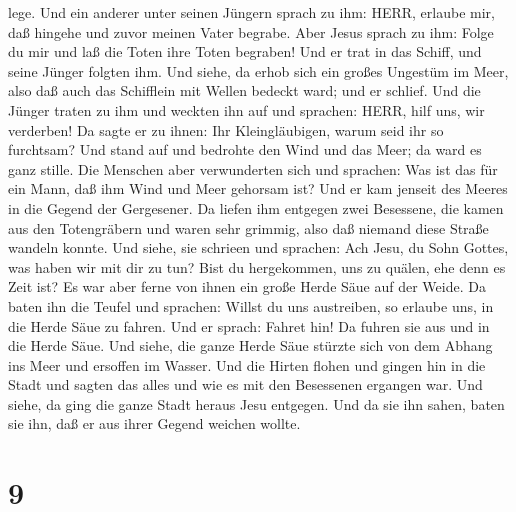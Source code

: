 lege.  Und ein anderer unter seinen Jüngern sprach zu ihm:
HERR, erlaube mir, daß hingehe und zuvor meinen Vater begrabe.
 Aber Jesus sprach zu ihm: Folge du mir und laß die Toten
ihre Toten begraben!  Und er trat in das Schiff, und seine
Jünger folgten ihm.  Und siehe, da erhob sich ein großes
Ungestüm im Meer, also daß auch das Schifflein mit Wellen bedeckt ward;
und er schlief.  Und die Jünger traten zu ihm und weckten
ihn auf und sprachen: HERR, hilf uns, wir verderben!  Da
sagte er zu ihnen: Ihr Kleingläubigen, warum seid ihr so furchtsam? Und
stand auf und bedrohte den Wind und das Meer; da ward es ganz stille.
 Die Menschen aber verwunderten sich und sprachen: Was ist
das für ein Mann, daß ihm Wind und Meer gehorsam ist?  Und
er kam jenseit des Meeres in die Gegend der Gergesener. Da liefen ihm
entgegen zwei Besessene, die kamen aus den Totengräbern und waren sehr
grimmig, also daß niemand diese Straße wandeln konnte.  Und
siehe, sie schrieen und sprachen: Ach Jesu, du Sohn Gottes, was haben
wir mit dir zu tun? Bist du hergekommen, uns zu quälen, ehe denn es Zeit
ist?  Es war aber ferne von ihnen ein große Herde Säue auf
der Weide.  Da baten ihn die Teufel und sprachen: Willst du
uns austreiben, so erlaube uns, in die Herde Säue zu fahren.
 Und er sprach: Fahret hin! Da fuhren sie aus und in die
Herde Säue. Und siehe, die ganze Herde Säue stürzte sich von dem Abhang
ins Meer und ersoffen im Wasser.  Und die Hirten flohen und
gingen hin in die Stadt und sagten das alles und wie es mit den
Besessenen ergangen war.  Und siehe, da ging die ganze
Stadt heraus Jesu entgegen. Und da sie ihn sahen, baten sie ihn, daß er
aus ihrer Gegend weichen wollte.

\hypertarget{section-8}{%
\section{9}\label{section-8}}

